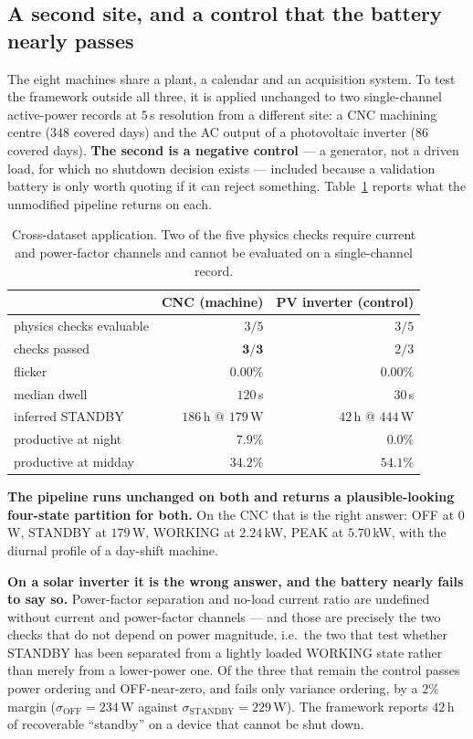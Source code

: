\subsection{A second site, and a control that the battery nearly passes}
\label{sec:crossmachine:dataset}

The eight machines share a plant, a calendar and an acquisition system.
To test the framework outside all three, it is applied unchanged to two
single-channel active-power records at $5$\,s resolution from a
different site: a CNC machining centre ($348$ covered days) and the AC
output of a photovoltaic inverter ($86$ covered days). \textbf{The
second is a negative control} --- a generator, not a driven load, for
which no shutdown decision exists --- included because a validation
battery is only worth quoting if it can reject something.
Table~\ref{tab:crossdataset} reports what the unmodified pipeline
returns on each.

\begin{table}[t]
\centering
\caption{Cross-dataset application. Two of the five physics checks
require current and power-factor channels and cannot be evaluated on a
single-channel record.}
\label{tab:crossdataset}
\small
\begin{tabular}{@{}lrr@{}}
\toprule
 & CNC (machine) & PV inverter (control) \\
\midrule
physics checks evaluable & $3/5$ & $3/5$ \\
checks passed            & $\mathbf{3/3}$ & $2/3$ \\
flicker                  & $0.00\%$ & $0.00\%$ \\
median dwell             & $120$\,s & $30$\,s \\
inferred STANDBY         & $186$\,h @ $179$\,W & $42$\,h @ $444$\,W \\
productive at night      & $7.9\%$ & $\mathbf{0.0\%}$ \\
productive at midday     & $34.2\%$ & $54.1\%$ \\
\bottomrule
\end{tabular}
\end{table}

\textbf{The pipeline runs unchanged on both and returns a
plausible-looking four-state partition for both.} On the CNC that is the
right answer: OFF at $0$\,W, STANDBY at $179$\,W, WORKING at $2.24$\,kW,
PEAK at $5.70$\,kW, with the diurnal profile of a day-shift machine.

\textbf{On a solar inverter it is the wrong answer, and the battery
nearly fails to say so.} Power-factor separation and no-load current
ratio are undefined without current and power-factor channels --- and
those are precisely the two checks that do not depend on power
magnitude, i.e.\ the two that test whether STANDBY has been separated
from a lightly loaded WORKING state rather than merely from a
lower-power one. Of the three that remain the control passes power
ordering and OFF-near-zero, and fails only variance ordering, by a $2\%$
margin ($\sigma_{\text{OFF}}=234$\,W against
$\sigma_{\text{STANDBY}}=229$\,W). The framework reports $42$\,h of
recoverable ``standby'' on a device that cannot be shut down.

